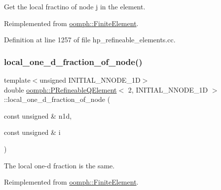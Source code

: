Get the local fractino of node j in the element. 



Reimplemented from \hyperlink{classoomph_1_1FiniteElement_a41640b9a9e5f6461cd8ebb8218502b07}{oomph\+::\+Finite\+Element}.



Definition at line 1257 of file hp\+\_\+refineable\+\_\+elements.\+cc.

\mbox{\label{classoomph_1_1PRefineableQElement_3_012_00_01INITIAL__NNODE__1D_01_4_af8b496db53a5d54b058f58f320e803f4}} 
\subsubsection{\texorpdfstring{local\+\_\+one\+\_\+d\+\_\+fraction\+\_\+of\+\_\+node()}{local\_one\_d\_fraction\_of\_node()}}
{\footnotesize\ttfamily template$<$unsigned I\+N\+I\+T\+I\+A\+L\+\_\+\+N\+N\+O\+D\+E\+\_\+1D$>$ \\
double \hyperlink{classoomph_1_1PRefineableQElement}{oomph\+::\+P\+Refineable\+Q\+Element}$<$ 2, I\+N\+I\+T\+I\+A\+L\+\_\+\+N\+N\+O\+D\+E\+\_\+1D $>$\+::local\+\_\+one\+\_\+d\+\_\+fraction\+\_\+of\+\_\+node (\begin{DoxyParamCaption}\item[{const unsigned \&}]{n1d,  }\item[{const unsigned \&}]{i }\end{DoxyParamCaption})\hspace{0.3cm}{\ttfamily [virtual]}}



The local one-\/d fraction is the same. 



Reimplemented from \hyperlink{classoomph_1_1FiniteElement_adb8ec7d2ceda37528c2d4542d572edf4}{oomph\+::\+Finite\+Element}.



